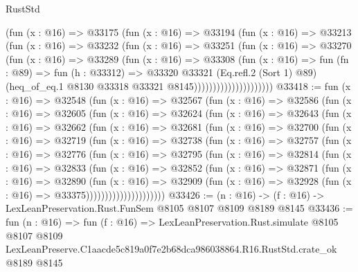 \begin{lexlean}{RustStd}
\begin{coremodule}
                          (fun (x : @16) =>
                          @33175
                            (fun (x : @16) =>
                            @33194
                              (fun (x : @16) =>
                              @33213
                                (fun (x : @16) =>
                                @33232
                                  (fun (x : @16) =>
                                  @33251
                                    (fun (x : @16) =>
                                    @33270
                                      (fun (x : @16) =>
                                      @33289
                                        (fun (x : @16) =>
                                        @33308
                                          (fun (x : @16) =>
                                          fun (fn : @89) =>
                                          fun (h : @33312) =>
                                          @33320
                                            @33321
                                            (Eq.refl.{2} (Sort 1) @89)
                                            (heq_of_eq.{1}
                                              @8130
                                              @33318
                                              @33321
                                              @8145)))))))))))))))))))))
@33418 := fun (x : @16) =>
  @32548
    (fun (x : @16) =>
    @32567
      (fun (x : @16) =>
      @32586
        (fun (x : @16) =>
        @32605
          (fun (x : @16) =>
          @32624
            (fun (x : @16) =>
            @32643
              (fun (x : @16) =>
              @32662
                (fun (x : @16) =>
                @32681
                  (fun (x : @16) =>
                  @32700
                    (fun (x : @16) =>
                    @32719
                      (fun (x : @16) =>
                      @32738
                        (fun (x : @16) =>
                        @32757
                          (fun (x : @16) =>
                          @32776
                            (fun (x : @16) =>
                            @32795
                              (fun (x : @16) =>
                              @32814
                                (fun (x : @16) =>
                                @32833
                                  (fun (x : @16) =>
                                  @32852
                                    (fun (x : @16) =>
                                    @32871
                                      (fun (x : @16) =>
                                      @32890
                                        (fun (x : @16) =>
                                        @32909
                                          (fun (x : @16) =>
                                          @32928 (fun (x : @16) => @33375)))))))))))))))))))))
@33426 := (n : @16) -> (f : @16) -> LexLeanPreservation.Rust.FunSem @8105 @8107 @8109 @8189 @8145
@33436 := fun (n : @16) =>
  fun (f : @16) =>
  LexLeanPreservation.Rust.simulate
    @8105
    @8107
    @8109
    LexLeanPreserve.C1aacde5c819a0f7e2b68dca986038864.R16.RustStd.crate_ok
    @8189
    @8145
\end{coremodule}
\end{lexlean}
